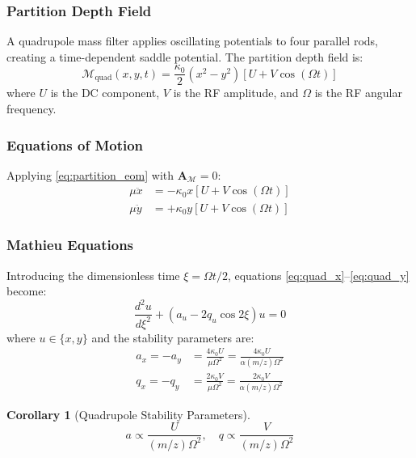 \documentclass[twocolumn,10pt,a4paper]{article}
\newtheorem{corollary}[theorem]{Corollary}
\theoremstyle{definition}
\theoremstyle{remark}
\newcommand{\Mdepth}{\mathcal{M}}
\newcommand{\Apartition}{\mathbf{A}_{\mathcal{M}}}
\newcommand{\partinert}{\mu}
\begin{document}
\subsubsection{Partition Depth Field}

A quadrupole mass filter applies oscillating potentials to four parallel rods, creating a time-dependent saddle potential. The partition depth field is:
\begin{equation}
    \Mdepth_{\mathrm{quad}}(x, y, t) = \frac{\kappa_0}{2}(x^2 - y^2)[U + V\cos(\Omega t)]
    \label{eq:quad_field}
\end{equation}
where $U$ is the DC component, $V$ is the RF amplitude, and $\Omega$ is the RF angular frequency.

\subsubsection{Equations of Motion}

Applying \eqref{eq:partition_eom} with $\Apartition = 0$:
\begin{align}
    \partinert\ddot{x} &= -\kappa_0 x[U + V\cos(\Omega t)] \label{eq:quad_x} \\
    \partinert\ddot{y} &= +\kappa_0 y[U + V\cos(\Omega t)] \label{eq:quad_y}
\end{align}

\subsubsection{Mathieu Equations}

Introducing the dimensionless time $\xi = \Omega t/2$, equations \eqref{eq:quad_x}--\eqref{eq:quad_y} become:
\begin{equation}
    \frac{d^2 u}{d\xi^2} + (a_u - 2q_u\cos 2\xi)u = 0
    \label{eq:mathieu}
\end{equation}
where $u \in \{x, y\}$ and the stability parameters are:
\begin{align}
    a_x = -a_y &= \frac{4\kappa_0 U}{\partinert\Omega^2} = \frac{4\kappa_0 U}{\alpha(m/z)\Omega^2} \label{eq:a_param} \\
    q_x = -q_y &= \frac{2\kappa_0 V}{\partinert\Omega^2} = \frac{2\kappa_0 V}{\alpha(m/z)\Omega^2} \label{eq:q_param}
\end{align}

\begin{corollary}[Quadrupole Stability Parameters]
\begin{equation}
    \boxed{a \propto \frac{U}{(m/z)\Omega^2}, \quad q \propto \frac{V}{(m/z)\Omega^2}}
\end{equation}
\end{corollary}
\end{document}
